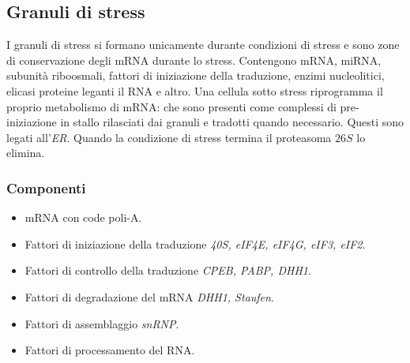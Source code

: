 \subsection{Granuli di stress}
I granuli di stress si formano unicamente durante condizioni di stress e sono zone di conservazione degli mRNA durante lo stress. Contengono mRNA, miRNA, subunit\`a riboosmali, fattori di iniziazione
della traduzione, enzimi nucleolitici, elicasi proteine leganti il RNA e altro. Una cellula sotto stress riprogramma il proprio metabolismo di mRNA: che sono presenti come complessi di pre-iniziazione
in stallo rilasciati dai granuli e tradotti quando necessario. Questi sono legati all'\emph{ER}. Quando la condizione di stress termina il proteasoma $26S$ lo elimina. 
\subsubsection{Componenti}
\begin{multicols}{2}
\begin{itemize}
	\item mRNA con code poli-A.
	\item  Fattori di iniziazione della traduzione \emph{40S, eIF4E, eIF4G, eIF3, eIF2}.
	\item Fattori di controllo della traduzione \emph{CPEB, PABP, DHH1}.
	\columnbreak
	\item Fattori di degradazione del mRNA \emph{DHH1, Staufen}.
	\item Fattori di assemblaggio \emph{snRNP}.
	\item Fattori di processamento del RNA.
\end{itemize}
\end{multicols}
